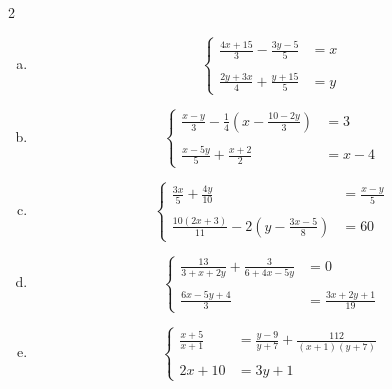 \documentclass[twoside, a4paper, 12pt, openright, fullpage]{book}
\begin{document}
\begin{exercice}
\begin{multicols}{2}
\begin{enumerate}[a)]
$$\begin{array}{ll}
            \end{array}
            \right.
            $$
    \item $$
            \left\{
            \begin{array}{ll}
              \displaystyle  \frac{4x+15}{3}-\frac{3y-5}{5}  &=x  \\
              \\
              \displaystyle   \frac{2y+3x}{4}+\frac{y+15}{5} &=y 
            \end{array}
            \right.
            $$
    \item $$
            \left\{
            \begin{array}{ll}
             \displaystyle   \frac{x-y}{3}-\frac{1}{4}\left(x-\frac{10-2y}{3}\right)  &=3  \\
             \\
             \displaystyle    \frac{x-5y}{5}+\frac{x+2}{2}&=x-4 
            \end{array}
            \right.
            $$
    \item $$
            \left\{
            \begin{array}{ll}
             \displaystyle   \frac{3x}{5}+\frac{4y}{10}  &=\frac{x-y}{5}  \\
             \\
              \displaystyle   \frac{10(2x+3)}{11}-2\left(y-\frac{3x-5}{8}\right) &=60 
            \end{array}
            \right.
            $$
    \item $$
            \left\{
            \begin{array}{ll}
              \displaystyle  \frac{13}{3+x+2y}+\frac{3}{6+4x-5y}  &=0  \\
              \\
              \displaystyle   \frac{6x-5y+4}{3} &=\frac{3x+2y+1}{19} 
            \end{array}
            \right.
            $$
    \item $$
            \left\{
            \begin{array}{ll}
              \displaystyle  \frac{x+5}{x+1}  &=\frac{y-9}{y+7}+\frac{112}{(x+1)(y+7)}  \\
              \\
              \displaystyle   2x+10 &=3y+1 
            \end{array}
            \right.
            $$
    \end{enumerate}
\end{multicols}
\end{exercice}
\end{document}
